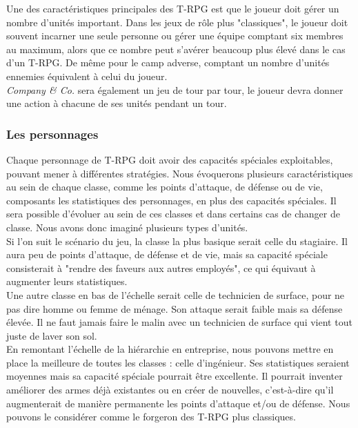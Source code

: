 \documentclass{article}
\begin{document}
Une des caractéristiques principales des T-RPG est que le joueur doit gérer un nombre d'unités important. Dans les jeux de rôle plus "classiques", le joueur doit souvent incarner une seule personne ou gérer une équipe comptant six membres au maximum, alors que ce nombre peut s'avérer beaucoup plus élevé dans le cas d'un T-RPG. De même pour le camp adverse, comptant un nombre d'unités ennemies équivalent à celui du joueur.\\

\textit{Company \& Co.} sera également un jeu de tour par tour, le joueur devra donner une action à chacune de ses unités pendant un tour.

\subsubsection{Les personnages}
Chaque personnage de T-RPG doit avoir des capacités spéciales exploitables, pouvant mener à différentes stratégies. Nous évoquerons plusieurs caractéristiques au sein de chaque classe, comme les points d'attaque, de défense ou de vie, composants les statistiques des personnages, en plus des capacités spéciales. Il sera possible d'évoluer au sein de ces classes et dans certains cas de changer de classe. Nous avons donc imaginé plusieurs types d'unités.\\

Si l'on suit le scénario du jeu, la classe la plus basique serait celle du stagiaire. Il aura peu de points d'attaque, de défense et de vie, mais sa capacité spéciale consisterait à "rendre des faveurs aux autres employés", ce qui équivaut à augmenter leurs statistiques.\\

Une autre classe en bas de l'échelle serait celle de technicien de surface, pour ne pas dire homme ou femme de ménage. Son attaque serait faible mais sa défense élevée. Il ne faut jamais faire le malin avec un technicien de surface qui vient tout juste de laver son sol.\\

En remontant l'échelle de la hiérarchie en entreprise, nous pouvons mettre en place la meilleure de toutes les classes : celle d'ingénieur. Ses statistiques seraient moyennes mais sa capacité spéciale pourrait être excellente. Il pourrait inventer améliorer des armes déjà existantes ou en créer de nouvelles, c'est-à-dire qu'il augmenterait de manière permanente les points d'attaque et/ou de défense. Nous pouvons le considérer comme le forgeron des T-RPG plus classiques.\\ 
\end{document}
